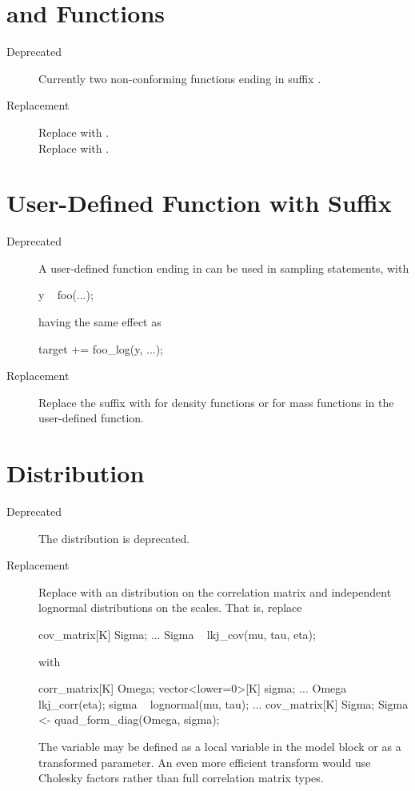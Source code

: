 \section{ and  Functions}

\begin{description}
\item[Deprecated]  Currently two non-conforming functions ending in
  suffix .
\item[Replacement] Replace  with
  .  
\\[4pt]
Replace  with .
\end{description}

\section{User-Defined Function with  Suffix}

\begin{description}
\item[Deprecated] A user-defined function ending in  can
  be used in sampling statements, with
%
\begin{stancode}
y ~ foo(...);
\end{stancode}
%
having the same effect as 
%
\begin{stancode}
target += foo_log(y, ...);
\end{stancode}
\item[Replacement]
Replace the  suffix with  for
density functions or  for mass functions in the
user-defined function.
\end{description}

\section{ Distribution}

\begin{description}
\item[Deprecated]The distribution  is deprecated.
\item[Replacement] Replace  with an
   distribution on the correlation matrix and
  independent lognormal distributions on the scales.  That is,
  replace
\begin{stancode}
cov_matrix[K] Sigma;
...
Sigma ~ lkj_cov(mu, tau, eta);
\end{stancode}
  with
\begin{stancode}
corr_matrix[K] Omega;
vector<lower=0>[K] sigma;
...
Omega ~ lkj_corr(eta);
sigma ~ lognormal(mu, tau);
...
cov_matrix[K] Sigma;
Sigma <- quad_form_diag(Omega, sigma);
\end{stancode}
The variable  may be defined as a local variable in the
model block or as a transformed parameter.  An even more efficient
transform would use Cholesky factors rather than full correlation
matrix types.
\end{description}

